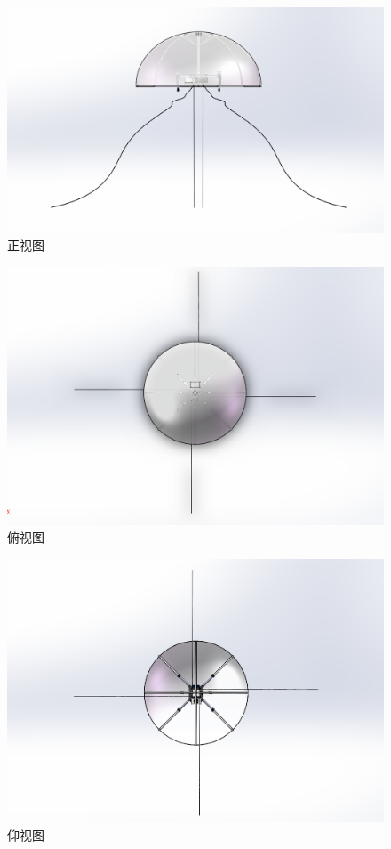 \documentclass{ctexart}
\begin{document}
\begin{figure}[H]
\centering
    \includegraphics[width = \textwidth]{003}
    \caption{正视图}\par
\end{figure}
\begin{figure}[H]
\centering
    \includegraphics[width = \textwidth]{004}
    \caption{俯视图}\par
\end{figure}
\begin{figure}[H]
\centering
    \includegraphics[width = \textwidth]{005}
    \caption{仰视图}\par
\end{figure}
\end{document}
